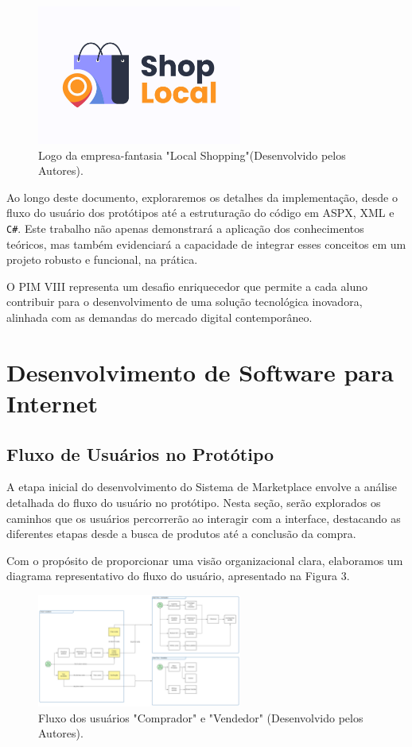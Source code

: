 \documentclass[
	12pt,				%
	openright,			%
	twoside,			%
	a4paper,			%
	english,			%
	brazil				%
	]{abntex2}
\begin{document}
\begin{figure}[htb]
	\centering
	\includegraphics[width=0.6\textwidth]{img/localshopping-logo}
	\caption{Logo da empresa-fantasia "Local Shopping"(Desenvolvido pelos Autores).}
	\label{fig:logo-local-shopping}
\end{figure}

Ao longo deste documento, exploraremos os detalhes da implementação, desde o fluxo do usuário dos protótipos até a estruturação do código em ASPX, XML e \texttt{C\#}. Este trabalho não apenas demonstrará a aplicação dos conhecimentos teóricos, mas também evidenciará a capacidade de integrar esses conceitos em um projeto robusto e funcional, na prática.

O PIM VIII representa um desafio enriquecedor que permite a cada aluno contribuir para o desenvolvimento de uma solução tecnológica inovadora, alinhada com as demandas do mercado digital contemporâneo.

\chapter{Desenvolvimento de Software para Internet}\label{cap_dev_sof_int}

\section{Fluxo de Usuários no Protótipo}

A etapa inicial do desenvolvimento do Sistema de Marketplace envolve a análise detalhada do fluxo do usuário no protótipo. Nesta seção, serão explorados os caminhos que os usuários percorrerão ao interagir com a interface, destacando as diferentes etapas desde a busca de produtos até a conclusão da compra.

Com o propósito de proporcionar uma visão organizacional clara, elaboramos um diagrama representativo do fluxo do usuário, apresentado na Figura 3.

\begin{figure}[htb]
    \centering
    \includegraphics[width=0.6\textwidth]{img/User-Flow}
    \caption{Fluxo dos usuários "Comprador" e "Vendedor" (Desenvolvido pelos Autores).}
    \label{fig:diagrama-user-flow}
\end{figure}
\end{document}

